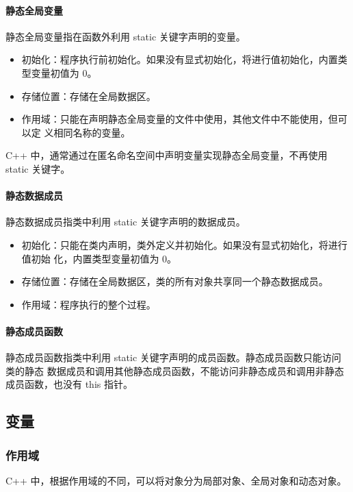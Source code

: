 \paragraph{静态全局变量}
静态全局变量指在函数外利用 static 关键字声明的变量。

\begin{itemize}
  \item 初始化：程序执行前初始化。如果没有显式初始化，将进行值初始化，内置类型变量初值为 0。
  \item 存储位置：存储在全局数据区。
  \item 作用域：只能在声明静态全局变量的文件中使用，其他文件中不能使用，但可以定
    义相同名称的变量。
\end{itemize}

C++ 中，通常通过在匿名命名空间中声明变量实现静态全局变量，不再使用 static 关键字。

\paragraph{静态数据成员}
静态数据成员指类中利用 static 关键字声明的数据成员。

\begin{itemize}
  \item 初始化：只能在类内声明，类外定义并初始化。如果没有显式初始化，将进行值初始
    化，内置类型变量初值为 0。
  \item 存储位置：存储在全局数据区，类的所有对象共享同一个静态数据成员。
  \item 作用域：程序执行的整个过程。
\end{itemize}

\paragraph{静态成员函数}
静态成员函数指类中利用 static 关键字声明的成员函数。静态成员函数只能访问类的静态
数据成员和调用其他静态成员函数，不能访问非静态成员和调用非静态成员函数，也没有
this 指针。

\subsection{变量}
\subsubsection{作用域}
C++ 中，根据作用域的不同，可以将对象分为局部对象、全局对象和动态对象。

